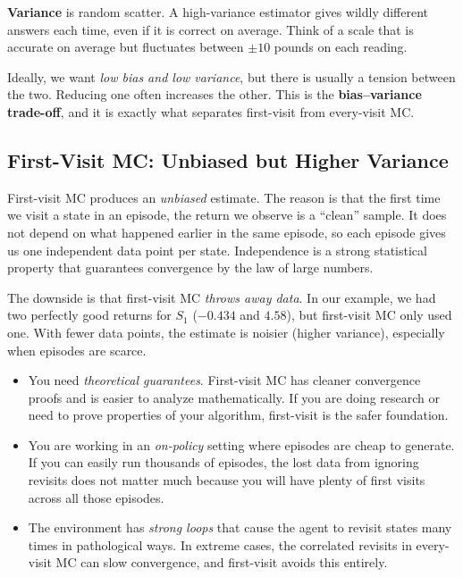 \documentclass[journal, onecolumn]{IEEEtran}
\newcommand{\vocab}[1]{\textbf{\textcolor{Garnet}{#1}}}
\begin{document}
\vocab{Variance} is random scatter. A high-variance estimator gives wildly different answers each time, even if it is correct on average. Think of a scale that is accurate on average but fluctuates between $\pm 10$ pounds on each reading.

Ideally, we want \textit{low bias and low variance}, but there is usually a tension between the two. Reducing one often increases the other. This is the \vocab{bias--variance trade-off}, and it is exactly what separates first-visit from every-visit MC.

\subsection{First-Visit MC: Unbiased but Higher Variance}

First-visit MC produces an \textit{unbiased} estimate. The reason is that the first time we visit a state in an episode, the return we observe is a ``clean'' sample. It does not depend on what happened earlier in the same episode, so each episode gives us one independent data point per state. Independence is a strong statistical property that guarantees convergence by the law of large numbers.

The downside is that first-visit MC \textit{throws away data}. In our example, we had two perfectly good returns for $S_1$ ($-0.434$ and $4.58$), but first-visit MC only used one. With fewer data points, the estimate is noisier (higher variance), especially when episodes are scarce.

\begin{tcolorbox}[examplebox={Choose First-Visit MC When...}]
\begin{itemize}[leftmargin=1.5em, itemsep=2pt]
    \item You need \textit{theoretical guarantees}. First-visit MC has cleaner convergence proofs and is easier to analyze mathematically. If you are doing research or need to prove properties of your algorithm, first-visit is the safer foundation.
    \item You are working in an \textit{on-policy} setting where episodes are cheap to generate. If you can easily run thousands of episodes, the lost data from ignoring revisits does not matter much because you will have plenty of first visits across all those episodes.
    \item The environment has \textit{strong loops} that cause the agent to revisit states many times in pathological ways. In extreme cases, the correlated revisits in every-visit MC can slow convergence, and first-visit avoids this entirely.
\end{itemize}
\end{tcolorbox}
\end{document}
